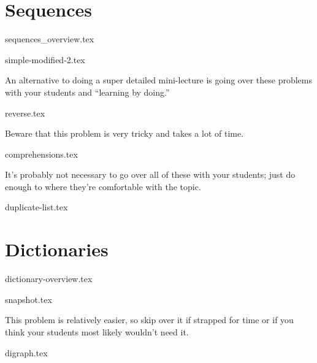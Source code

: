 \documentclass{exam}
\begin{document}
\section{Sequences}
{sequences_overview.tex}
\begin{questions}
    {simple-modified-2.tex}
    \begin{questionmeta}
        An alternative to doing a super detailed mini-lecture is going over these problems with your students and ``learning by doing.'' 
    \end{questionmeta}
    {reverse.tex}
    \begin{questionmeta}
        Beware that this problem is very tricky and takes a lot of time.
    \end{questionmeta}
    {comprehensions.tex}
    \begin{questionmeta}
        It's probably not necessary to go over all of these with your students; just do enough to where they're comfortable with the topic. 
    \end{questionmeta}
    {duplicate-list.tex}
\end{questions}

\section{Dictionaries}
{dictionary-overview.tex}
\begin{questions}
    {snapshot.tex}
    \begin{questionmeta}
        This problem is relatively easier, so skip over it if strapped for time or if you think your students most likely wouldn't need it. 
    \end{questionmeta}
    {digraph.tex}
\end{questions}
\end{document}
